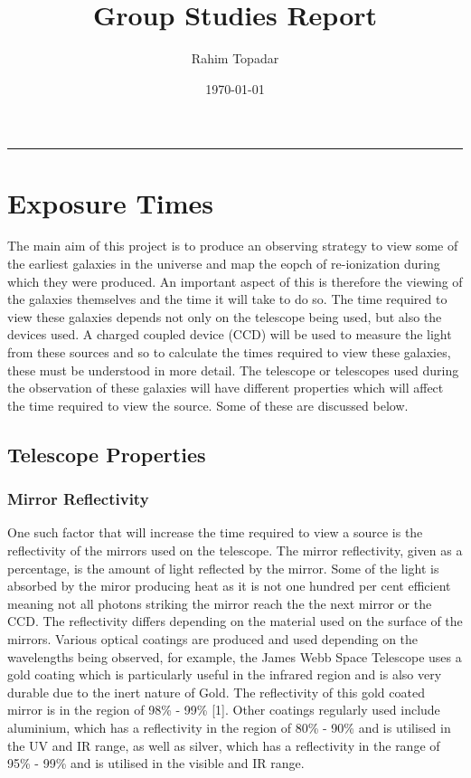 \documentclass[pdf,color]{UoBnote}
\author{Rahim Topadar}
\title{Group Studies Report}
\date{\today}
\begin{document}
\maketitle
\tableofcontents
\vspace{1cm}\hrule \vspace{1cm}



\section{Exposure Times}

The main aim of this project is to produce an observing strategy to view some of the earliest galaxies in the universe and map the eopch of re-ionization during which they were produced. An important aspect of this is therefore the viewing of the galaxies themselves and the time it will take to do so. The time required to view these galaxies depends not only on the telescope being used, but also the devices used. A charged coupled device (CCD) will be used to measure the light from these sources and so to calculate the times required to view these galaxies, these must be understood in more detail. The telescope or telescopes used during the observation of these galaxies will have different properties which will affect the time required to view the source. Some of these are discussed below.

\subsection{Telescope Properties}
\subsubsection{Mirror Reflectivity}
One such factor that will increase the time required to view a source is the reflectivity of the mirrors used on the telescope. The mirror reflectivity, given as a percentage, is the amount of light reflected by the mirror. Some of the light is absorbed by the miror producing heat as it is not one hundred per cent efficient meaning not all photons striking the mirror reach the the next mirror or the CCD. The reflectivity differs depending on the material used on the surface of the mirrors. Various optical coatings are produced and used depending on the wavelengths being observed, for example, the James Webb Space Telescope uses a gold coating which is particularly useful in the infrared region and is also very durable due to the inert nature of Gold. The reflectivity of this gold coated mirror is in the region of 98\% - 99\% [1]. Other coatings regularly used include aluminium, which has a reflectivity in the region of 80\% - 90\% and is utilised in the UV and IR range, as well as silver, which has a reflectivity in the range of 95\% - 99\% and is utilised in the visible and IR range.
\end{document}
